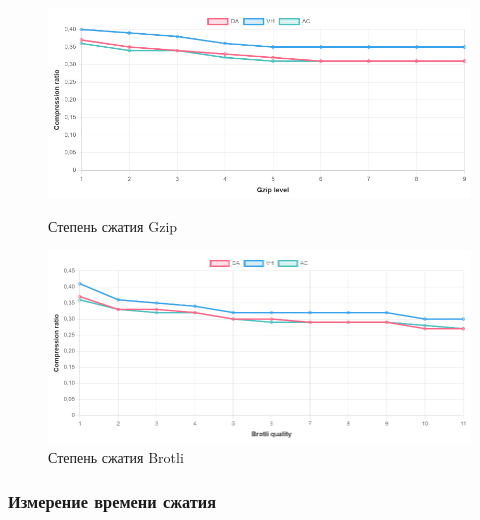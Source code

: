 \documentclass[12pt]{article}
\begin{document}
\begin{figure}[H]
    \centering
    \begin{minipage}{0.48\textwidth}
        \centering
        \includegraphics[width=\linewidth]{../images/gzip_compress_ratio.png}
        \caption{Степень сжатия Gzip}
        \label{fig:image1}
    \end{minipage}
    \hfill
    \begin{minipage}{0.48\textwidth}
        \centering
        \includegraphics[width=\linewidth]{../images/brotli_compressed_ratio.png}
        \caption{Степень сжатия Brotli}
        \label{fig:image2}
    \end{minipage}
\end{figure}

\subsubsection{Измерение времени сжатия}
\end{document}
